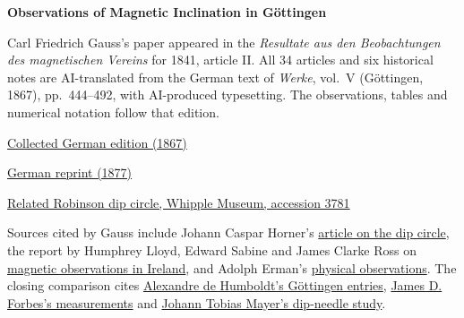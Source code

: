 \clearpage
\thispagestyle{empty}
\begin{center}\Large\textbf{Observations of Magnetic Inclination in Göttingen}\end{center}

Carl Friedrich Gauss’s paper appeared in the \textit{Resultate aus den Beobachtungen des magnetischen Vereins} for 1841, article II. All 34 articles and six historical notes are AI-translated from the German text of \textit{Werke}, vol.~V (Göttingen, 1867), pp.~444--492, with AI-produced typesetting. The observations, tables and numerical notation follow that edition.

\medskip\noindent
\href{https://gdz.sub.uni-goettingen.de/id/PPN236006339}{Collected German edition (1867)}\par
\noindent\href{https://doi.org/10.1007/978-3-642-49319-5_22}{German reprint (1877)}\par
\noindent\href{https://collections.whipplemuseum.cam.ac.uk/objects/12342/}{Related Robinson dip circle, Whipple Museum, accession 3781}

\medskip\noindent
Sources cited by Gauss include Johann Caspar Horner’s \href{https://api.digitale-sammlungen.de/iiif/image/v2/bsb10131088_00105/full/1500,/0/default.jpg}{article on the dip circle}, the report by Humphrey Lloyd, Edward Sabine and James Clarke Ross on \href{https://archive.org/download/reportofbritisha05unse/page/n207.jpg}{magnetic observations in Ireland}, and Adolph Erman’s \href{https://resolver.sub.uni-goettingen.de/purl?PPN329604732}{physical observations}. The closing comparison cites \href{https://books.google.com/books?id=O_kOAAAAQAAJ&pg=PA152}{Alexandre de Humboldt’s Göttingen entries}, \href{https://doi.org/10.1017/S008045680002980X}{James D. Forbes’s measurements} and \href{https://gdz.sub.uni-goettingen.de/id/PPN35283028X_0003_2NS}{Johann Tobias Mayer’s dip-needle study}.
\clearpage

